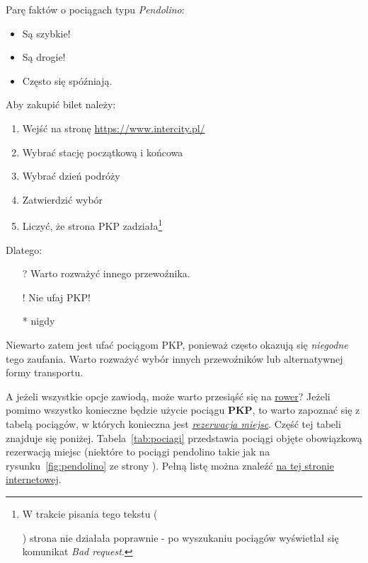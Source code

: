 Parę faktów o pociągach typu \emph{Pendolino}:
\begin{itemize}
    \item Są szybkie!
    \item Są drogie!
    \item Często się spóźniają.
\end{itemize}

Aby zakupić bilet należy:
\begin{enumerate}
    \item Wejść na stronę \url{https://www.intercity.pl/}
    \item Wybrać stację początkową i końcowa
    \item Wybrać dzień podróży
    \item Zatwierdzić wybór
    \item Liczyć, że strona PKP zadziała\footnote{W trakcie pisania tego tekstu (\date{25.10.2023}) strona nie działała poprawnie - po wyszukaniu pociągów wyświetlał się komunikat \emph{Bad request}.}
\end{enumerate}

Dlatego:
\begin{itemize}
    \item[?] Warto rozważyć innego przewoźnika.
    \item[!] Nie ufaj PKP!
    \item[*] nigdy
\end{itemize}

Niewarto zatem jest ufać pociągom PKP, ponieważ często okazują się \emph{niegodne} tego zaufania. Warto rozważyć wybór innych przewoźników lub alternatywnej formy transportu.\par
A jeżeli wszystkie opcje zawiodą, może warto przesiąść się na \underline{rower}? Jeżeli pomimo wszystko konieczne będzie użycie pociągu \textbf{PKP}, to warto zapoznać się z tabelą pociągów, w których konieczna jest \underline{\textit{rezerwacja miejsc}}. Część tej tabeli znajduje się poniżej. Tabela~\ref{tab:pociagi} przedstawia pociągi objęte obowiązkową rezerwacją miejsc (niektóre to pociągi pendolino takie jak na rysunku~\ref{fig:pendolino} ze strony \pageref{fig:pendolino}). Pełną listę można znaleźć \href{https://www.intercity.pl/pl/site/o-nas/dzial-prasowy/komunikaty/lista-pociagow-objetych-obowiazkowa-rezerwacja-miejsc.html}{na tej stronie internetowej}.


